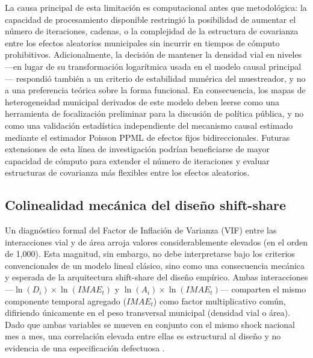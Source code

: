 \documentclass[
  spanish,
  12pt,
  letterpaper]{article}
\begin{document}
La causa principal de esta limitación es computacional antes que
metodológica: la capacidad de procesamiento disponible restringió la
posibilidad de aumentar el número de iteraciones, cadenas, o la
complejidad de la estructura de covarianza entre los efectos aleatorios
municipales sin incurrir en tiempos de cómputo prohibitivos.
Adicionalmente, la decisión de mantener la densidad vial en niveles
---en lugar de su transformación logarítmica usada en el modelo causal
principal--- respondió también a un criterio de estabilidad numérica del
muestreador, y no a una preferencia teórica sobre la forma funcional. En
consecuencia, los mapas de heterogeneidad municipal derivados de este
modelo deben leerse como una herramienta de focalización preliminar para
la discusión de política pública, y no como una validación estadística
independiente del mecanismo causal estimado mediante el estimador
Poisson PPML de efectos fijos bidireccionales. Futuras extensiones de
esta línea de investigación podrían beneficiarse de mayor capacidad de
cómputo para extender el número de iteraciones y evaluar estructuras de
covarianza más flexibles entre los efectos aleatorios.

\subsection{Colinealidad mecánica del diseño
shift-share}\label{colinealidad-mecuxe1nica-del-diseuxf1o-shift-share}

Un diagnóstico formal del Factor de Inflación de Varianza (VIF) entre
las interacciones vial y de área arroja valores considerablemente
elevados (en el orden de 1,000). Esta magnitud, sin embargo, no debe
interpretarse bajo los criterios convencionales de un modelo lineal
clásico, sino como una consecuencia mecánica y esperada de la
arquitectura shift-share del diseño empírico. Ambas interacciones
---\(\ln(D_i) \times \ln(IMAE_t)\) y \(\ln(A_i) \times \ln(IMAE_t)\)---
comparten el mismo componente temporal agregado (\(IMAE_t\)) como factor
multiplicativo común, difiriendo únicamente en el peso transversal
municipal (densidad vial o área). Dado que ambas variables se mueven en
conjunto con el mismo shock nacional mes a mes, una correlación elevada
entre ellas es estructural al diseño y no evidencia de una
especificación defectuosa
\parencite{borusyak2022quasi, goldsmith2020bartik}.
\end{document}

